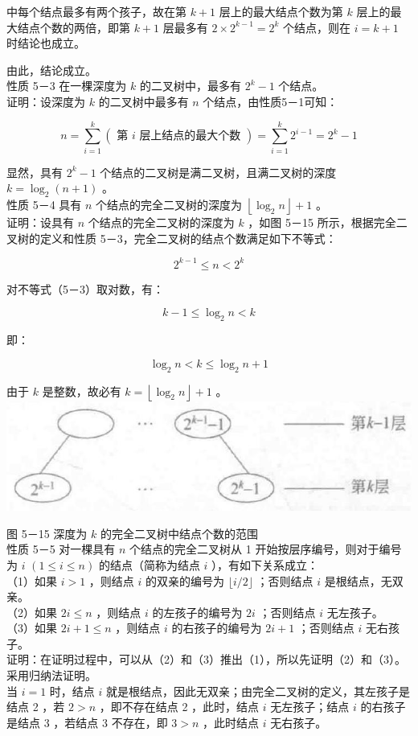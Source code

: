 \documentclass[10pt]{article}
\begin{document}
中每个结点最多有两个孩子，故在第 $k+1$ 层上的最大结点个数为第 $k$ 层上的最大结点个数的两倍，即第 $k+1$ 层最多有 $2 \times 2^{k-1}=2^{k}$ 个结点，则在 $i=k+1$ 时结论也成立。

由此，结论成立。\\
性质 5－3 在一棵深度为 $k$ 的二叉树中，最多有 $2^{k}-1$ 个结点。\\
证明：设深度为 $k$ 的二叉树中最多有 $n$ 个结点，由性质5－1可知：

$$
n=\sum_{i=1}^{k}(\text { 第 } i \text { 层上结点的最大个数 })=\sum_{i=1}^{k} 2^{i-1}=2^{k}-1
$$

显然，具有 $2^{k}-1$ 个结点的二叉树是满二叉树，且满二叉树的深度 $k=\log _{2}(n+1)$ 。\\
性质 5－4 具有 $n$ 个结点的完全二叉树的深度为 $\left\lfloor\log _{2} n\right\rfloor+1$ 。\\
证明：设具有 $n$ 个结点的完全二叉树的深度为 $k$ ，如图 5－15 所示，根据完全二叉树的定义和性质 5－3，完全二叉树的结点个数满足如下不等式：


\begin{equation*}
2^{k-1} \leqslant n<2^{k} \tag{5-3}
\end{equation*}


对不等式（5－3）取对数，有：

$$
k-1 \leqslant \log _{2} n<k
$$

即：

$$
\log _{2} n<k \leqslant \log _{2} n+1
$$

由于 $k$ 是整数，故必有 $k=\left\lfloor\log _{2} n\right\rfloor+1$ 。\\
\includegraphics[max width=\textwidth, center]{2025_06_06_704745ea57b15b2333e5g-150}

图 5－15 深度为 $k$ 的完全二叉树中结点个数的范围\\
性质 5－5 对一棵具有 $n$ 个结点的完全二叉树从 1 开始按层序编号，则对于编号为 $i$ $(1 \leqslant i \leqslant n)$ 的结点（简称为结点 $i$ ），有如下关系成立：\\
（1）如果 $i>1$ ，则结点 $i$ 的双亲的编号为 $\lfloor i / 2\rfloor$ ；否则结点 $i$ 是根结点，无双亲。\\
（2）如果 $2 i \leqslant n$ ，则结点 $i$ 的左孩子的编号为 $2 i$ ；否则结点 $i$ 无左孩子。\\
（3）如果 $2 i+1 \leqslant n$ ，则结点 $i$ 的右孩子的编号为 $2 i+1$ ；否则结点 $i$ 无右孩子。\\
证明：在证明过程中，可以从（2）和（3）推出（1），所以先证明（2）和（3）。采用归纳法证明。\\
当 $i=1$ 时，结点 $i$ 就是根结点，因此无双亲；由完全二叉树的定义，其左孩子是结点 2 ，若 $2>n$ ，即不存在结点 2 ，此时，结点 $i$ 无左孩子；结点 $i$ 的右孩子是结点 3 ，若结点 3 不存在，即 $3>n$ ，此时结点 $i$ 无右孩子。
\end{document}
